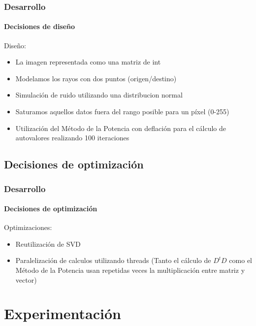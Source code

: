\documentclass{beamer}
\begin{document}
\begin{frame}
\frametitle{Desarrollo}
\framesubtitle{Decisiones de diseño}
Diseño:
\begin{itemize}
	\item La imagen representada como una matriz de int
	\item Modelamos los rayos con dos puntos (origen/destino)
	\item Simulación de ruido utilizando una distribucion normal
	\item Saturamos aquellos datos fuera del rango posible para un píxel (0-255)
	\item Utilización del Método de la Potencia con deflación para el cálculo de autovalores realizando 100 iteraciones
\end{itemize}

\end{frame}

\subsection{Decisiones de optimización}

\begin{frame}
\frametitle{Desarrollo}
\framesubtitle{Decisiones de optimización}

Optimizaciones:
\begin{itemize}
	\item Reutilización de SVD
	\item Paralelización de calculos utilizando threads (Tanto el cálculo de $D^{t}D$ como el Método de la Potencia usan repetidas veces la multiplicación entre matriz y vector)
\end{itemize}


\end{frame}

\section{Experimentación}
\end{document}
